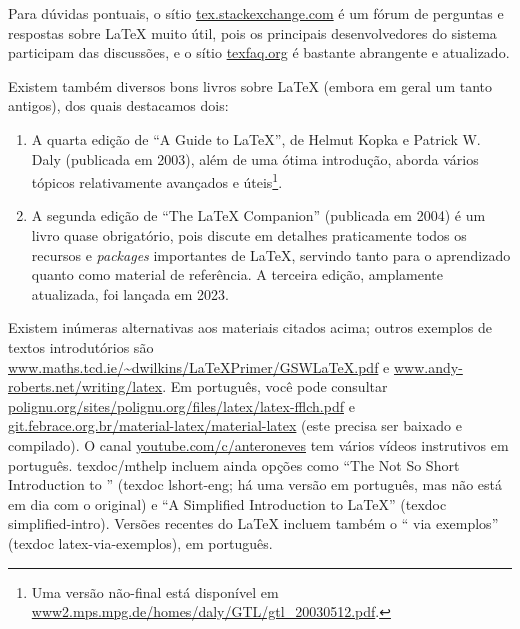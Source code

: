 Para dúvidas pontuais, o sítio \url{tex.stackexchange.com} é um fórum
de perguntas e respostas sobre \LaTeX{} muito útil, pois os principais
desenvolvedores do sistema participam das discussões, e o sítio
\url{texfaq.org} é bastante abrangente e atualizado.

Existem também diversos bons livros sobre \LaTeX{} (embora em geral um
tanto antigos), dos quais destacamos dois:

\begin{enumerate}

  \item A quarta edição de ``A Guide to \LaTeX'', de Helmut Kopka
        e Patrick W. Daly (publicada em 2003), além de uma ótima
        introdução, aborda vários tópicos relativamente avançados
        e úteis\footnote{Uma versão não-final está disponível em
        \url{www2.mps.mpg.de/homes/daly/GTL/gtl_20030512.pdf}.}.
  \item A segunda edição de ``The \LaTeX{} Companion'' (publicada em
        2004) é um livro quase obrigatório, pois discute em detalhes
        praticamente todos os recursos e \textit{packages} importantes
        de \LaTeX{}, servindo tanto para o aprendizado quanto como
        material de referência. A terceira edição, amplamente atualizada,
        foi lançada em 2023.

\end{enumerate}

\froufrou

Existem inúmeras alternativas aos materiais citados acima; outros exemplos de
textos introdutórios são \url{www.maths.tcd.ie/~dwilkins/LaTeXPrimer/GSWLaTeX.pdf}
e \url{www.andy-roberts.net/writing/latex}. Em português, você pode
consultar \url{polignu.org/sites/polignu.org/files/latex/latex-fflch.pdf}
e \url{git.febrace.org.br/material-latex/material-latex} (este precisa ser
baixado e compilado). O canal \url{youtube.com/c/anteroneves} tem vários
vídeos instrutivos em português. \textsf{texdoc/mthelp} incluem ainda opções
como ``The Not So Short Introduction to \LaTeXe{}'' (\textsf{texdoc
lshort-eng}; há uma versão em português, mas não está em dia com o original)
e ``A Simplified Introduction to \LaTeX{}'' (\textsf{texdoc simplified-intro}).
Versões recentes do \LaTeX{} incluem também o ``\LaTeXe{} via exemplos''
(\textsf{texdoc latex-via-exemplos}), em português.

